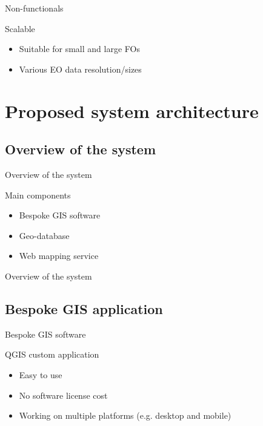 \begin{frame}{Non-functionals}
	\begin{block}{Scalable}
		\begin{itemize}
			\item Suitable for small and large FOs
			\item Various EO data resolution/sizes
		\end{itemize}
	\end{block}
	
\end{frame}

\section{Proposed system architecture}
\subsection{Overview of the system}

\begin{frame}{Overview of the system}
	\begin{block}{Main components}
		\begin{itemize}
			\item Bespoke GIS software
			\item Geo-database
			\item Web mapping service
		\end{itemize}
	\end{block}
\end{frame}

\begin{frame}{Overview of the system}
\end{frame}

\subsection{Bespoke GIS application}
\begin{frame}{Bespoke GIS software}
	\begin{block}{QGIS custom application}
		\begin{itemize}
			\item Easy to use
			\item No software license cost
			\item Working on multiple platforms (e.g. desktop and mobile)
		\end{itemize}
	\end{block}
\end{frame}

